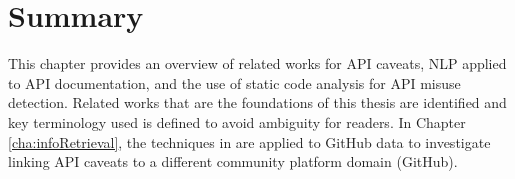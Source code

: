 \section{Summary}
This chapter provides an overview of related works for API caveats, NLP applied to API documentation, and the use of static code analysis for API misuse detection. Related works that are the foundations of this thesis are identified and key terminology used is defined to avoid ambiguity for readers. In Chapter \ref{cha:infoRetrieval}, the techniques in \cite{jiamou} are applied to GitHub data to investigate linking API caveats to a different community platform domain (GitHub).


